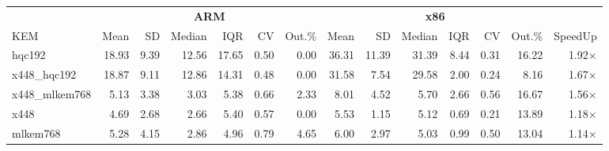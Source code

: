 \begin{table}[!ht]
\centering
\begin{tabular}{l|rrrrrr|rrrrrr|r}
\toprule
& \multicolumn{6}{c}{\bfseries ARM} & \multicolumn{6}{c}{\bfseries x86} & \\
\cmidrule(lr){2-7} \cmidrule(lr){8-13}
KEM & Mean & SD & Median & IQR & CV & Out.\% & Mean & SD & Median & IQR & CV & Out.\% & SpeedUp \\
\midrule
hqc192 & 18.93 & 9.39 & 12.56 & 17.65 & 0.50 & 0.00 & 36.31 & 11.39 & 31.39 & 8.44 & 0.31 & 16.22 & 1.92× \\
x448_hqc192 & 18.87 & 9.11 & 12.86 & 14.31 & 0.48 & 0.00 & 31.58 & 7.54 & 29.58 & 2.00 & 0.24 & 8.16 & 1.67× \\
x448_mlkem768 & 5.13 & 3.38 & 3.03 & 5.38 & 0.66 & 2.33 & 8.01 & 4.52 & 5.70 & 2.66 & 0.56 & 16.67 & 1.56× \\
x448 & 4.69 & 2.68 & 2.66 & 5.40 & 0.57 & 0.00 & 5.53 & 1.15 & 5.12 & 0.69 & 0.21 & 13.89 & 1.18× \\
mlkem768 & 5.28 & 4.15 & 2.86 & 4.96 & 0.79 & 4.65 & 6.00 & 2.97 & 5.03 & 0.99 & 0.50 & 13.04 & 1.14× \\
\bottomrule
\end{tabular}
\end{table}
